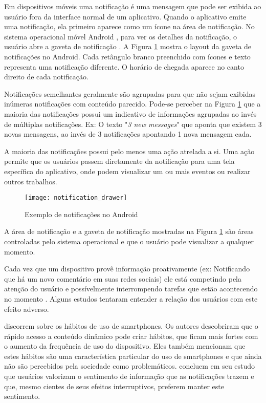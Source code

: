 Em dispositivos móveis uma notificação é uma mensagem que pode ser exibida ao usuário fora da interface normal de um aplicativo.
Quando o aplicativo emite uma notificação, ela primeiro aparece como um ícone na área de notificação. No sistema operacional móvel
Android \cite{android}, para ver os detalhes da notificação, o usuário abre a gaveta de notificação \cite{notificationDrawer}. A Figura
\ref{notification-drawer} mostra o layout da gaveta de notificações no Android. Cada retângulo branco preenchido com ícones
e texto representa uma notificação diferente. O horário de chegada aparece no canto direito de cada notificação.

Notificações semelhantes geralmente são agrupadas para que não sejam exibidas inúmeras notificações com conteúdo parecido.
Pode-se perceber na Figura \ref{notification-drawer} que a maioria das notificações possui um indicativo de informações agrupadas
ao invés de múltiplas notificações. Ex: O texto "\textit{3 new messages}" que aponta que existem 3 novas mensagens, ao invés de 3
notificações apontando 1 nova mensagem cada.

A maioria das notificações possui pelo menos uma ação atrelada a si. Uma ação permite que os usuários passem
diretamente da notificação para uma tela específica do aplicativo, onde podem visualizar um ou mais eventos ou realizar
outros trabalhos.

\begin{figure}[h]
\centering
\texttt{[image: notification\_drawer]}
\caption{Exemplo de notificações no Android \cite{notificationDrawer}}
\label{notification-drawer}
\end{figure}

A área de notificação e a gaveta de notificação mostradas na Figura \ref{notification-drawer} são áreas controladas pelo
sistema operacional e que o usuário pode visualizar a qualquer momento.

Cada vez que um dispositivo provê informação proativamente (ex: Notificando que há um novo comentário em suas redes
sociais) ele está competindo pela atenção do usuário e possívelmente interrompendo tarefas que estão acontecendo no momento
\cite{ho2005using}. Alguns estudos tentaram entender a relação dos usuários com este efeito adverso.

 discorrem sobre os hábitos de uso de smartphones. Os autores descobriram que o rápido acesso a
conteúdo dinâmico pode criar hábitos, que ficam mais fortes com o aumento da frequência de uso do dispositivo. Eles
também mencionam que estes hábitos são uma característica particular do uso de smartphones e que ainda não são percebidos
pela sociedade como problemáticos.  concluem em seu estudo que usuários valorizam o sentimento
de informação que as notificações trazem e que, mesmo cientes de seus efeitos interruptivos, preferem manter este sentimento.

